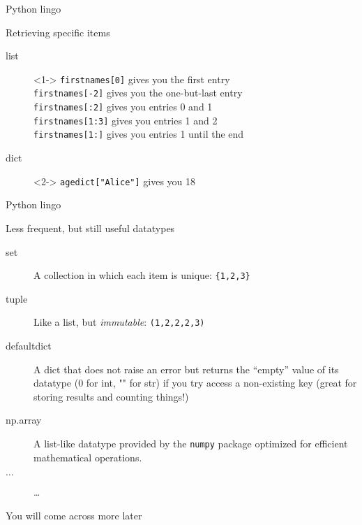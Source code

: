 \begin{frame}{Python lingo}
	\begin{block}{Retrieving specific items}
		\begin{description}
			\item[{\color{red}list}]<1-> \texttt{firstnames[0]} gives you the first entry\\ 
				\texttt{firstnames[-2]} gives you the one-but-last entry\\
				\texttt{firstnames[:2]} gives you entries 0 and 1\\
				\texttt{firstnames[1:3]} gives you entries 1 and 2\\
				\texttt{firstnames[1:]} gives you entries 1 until the end\\
			\item[{\color{red}dict}]<2-> \texttt{agedict["Alice"]} gives you 18 
		\end{description}
	
	\end{block}
\end{frame}




\begin{frame}{Python lingo}
	\begin{block}{Less frequent, but still useful datatypes}
		\begin{description}
			\item[{\color{red}set}]A collection in which each item is unique: \texttt{\{1,2,3\}}
			\item[{\color{red}tuple}]Like a list, but \emph{immutable}: \texttt{(1,2,2,2,3)}
			\item[{\color{red}defaultdict}]A dict that does not raise an error but returns the ``empty'' value of its datatype (0 for int, "" for str) if you try access a non-existing key (great for storing results and counting things!)
			\item[{\color{red}np.array}]A list-like datatype provided by the \texttt{numpy} package optimized for efficient mathematical operations.
			\item[$\ldots$]\ldots
		\end{description}
	\end{block}
\small{You will come across more later}
\end{frame}



